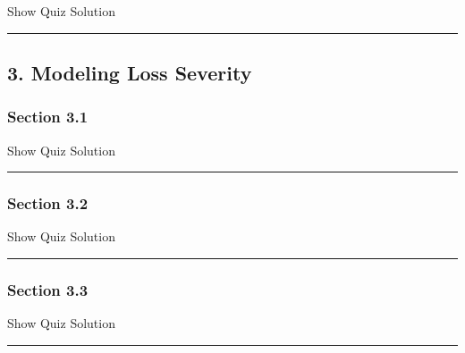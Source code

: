 \documentclass[]{article}
\begin{document}
\hypertarget{surveyResult27}{}

Show Quiz Solution

\hypertarget{display.Quiz27.2}{}
\begin{center}\rule{0.5\linewidth}{\linethickness}\end{center}

\subsection{3. Modeling Loss Severity}\label{modeling-loss-severity}

\subsubsection{Section 3.1}\label{section-3.1}

\hypertarget{surveyElement31}{}

\hypertarget{surveyResult31}{}

Show Quiz Solution

\hypertarget{display.Quiz31.2}{}
\begin{center}\rule{0.5\linewidth}{\linethickness}\end{center}

\subsubsection{Section 3.2}\label{section-3.2}

\hypertarget{surveyElement32}{}

\hypertarget{surveyResult32}{}

Show Quiz Solution

\hypertarget{display.Quiz32.2}{}
\begin{center}\rule{0.5\linewidth}{\linethickness}\end{center}

\subsubsection{Section 3.3}\label{section-3.3}

\hypertarget{surveyElement33}{}

\hypertarget{surveyResult33}{}

Show Quiz Solution

\hypertarget{display.Quiz33.2}{}
\begin{center}\rule{0.5\linewidth}{\linethickness}\end{center}
\end{document}
